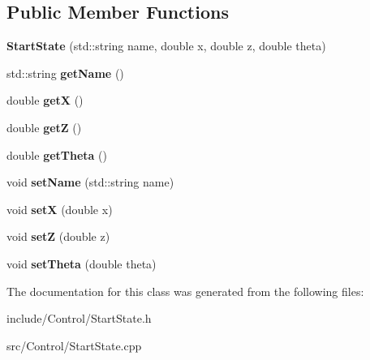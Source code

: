 \subsection*{Public Member Functions}
\begin{DoxyCompactItemize}
\item 
\hypertarget{classCartWheel_1_1StartState_ac3e92551ba527eb07830bffdf1934225}{
{\bfseries StartState} (std::string name, double x, double z, double theta)}
\label{classCartWheel_1_1StartState_ac3e92551ba527eb07830bffdf1934225}

\item 
\hypertarget{classCartWheel_1_1StartState_ad505f981667ee10508a63a12021266e4}{
std::string {\bfseries getName} ()}
\label{classCartWheel_1_1StartState_ad505f981667ee10508a63a12021266e4}

\item 
\hypertarget{classCartWheel_1_1StartState_a9b7e63b83984e32c59790d4bbc9c90f5}{
double {\bfseries getX} ()}
\label{classCartWheel_1_1StartState_a9b7e63b83984e32c59790d4bbc9c90f5}

\item 
\hypertarget{classCartWheel_1_1StartState_a69ad2ee15e794e4755541c2e980ee3c3}{
double {\bfseries getZ} ()}
\label{classCartWheel_1_1StartState_a69ad2ee15e794e4755541c2e980ee3c3}

\item 
\hypertarget{classCartWheel_1_1StartState_acfbde3ff75027b1cb8955821393823f0}{
double {\bfseries getTheta} ()}
\label{classCartWheel_1_1StartState_acfbde3ff75027b1cb8955821393823f0}

\item 
\hypertarget{classCartWheel_1_1StartState_aa74d3f7b688f77ba920e7e1fc5f27631}{
void {\bfseries setName} (std::string name)}
\label{classCartWheel_1_1StartState_aa74d3f7b688f77ba920e7e1fc5f27631}

\item 
\hypertarget{classCartWheel_1_1StartState_a126ca65513e9ad4269132c50c05db1f0}{
void {\bfseries setX} (double x)}
\label{classCartWheel_1_1StartState_a126ca65513e9ad4269132c50c05db1f0}

\item 
\hypertarget{classCartWheel_1_1StartState_af263e5ff5593e6083e3c8364380337da}{
void {\bfseries setZ} (double z)}
\label{classCartWheel_1_1StartState_af263e5ff5593e6083e3c8364380337da}

\item 
\hypertarget{classCartWheel_1_1StartState_a2c2cb0d6a43d59463a5f7768b3f88483}{
void {\bfseries setTheta} (double theta)}
\label{classCartWheel_1_1StartState_a2c2cb0d6a43d59463a5f7768b3f88483}

\end{DoxyCompactItemize}


The documentation for this class was generated from the following files:\begin{DoxyCompactItemize}
\item 
include/Control/StartState.h\item 
src/Control/StartState.cpp\end{DoxyCompactItemize}
